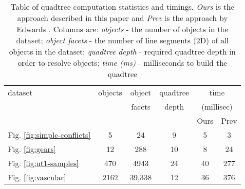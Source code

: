 \documentclass[final,3p,times,twocolumn]{elsarticle}
\begin{document}

\begin{table}
  \centering
  \footnotesize{
  \begin{tabular}{lcc|c|cc}
    \toprule
    dataset & objects & object          & quadtree
    & \multicolumn{2}{c}{time} \\
            &         & facets          & depth
    & \multicolumn{2}{c}{(millisec)} \\
           &&&
    & Ours & Prev \\
    \hline

    Fig. \ref{fig:simple-conflicts} & 5 & 24 & 9 & 5 & 3 \\

    Fig. \ref{fig:gears} & 12 & 288 & 10 & 8 & 24 \\

    Fig. \ref{fig:ut1-samples} & 470 & 4943 & 24 & 40 & 277 \\

    Fig. \ref{fig:vascular} & 2162 & 39,338 & 12 & 36 & 376 \\

    \bottomrule
  \end{tabular}}
  \caption{Table of quadtree computation statistics and timings. \emph{Ours} is the approach described in this paper and \emph{Prev} is the approach by Edwards \etal \cite{edwards2015approximating}. Columns are: \emph{objects} - the number of objects in the dataset; \emph{object facets} - the number of line segments (2D) of all objects in the dataset; \emph{quadtree depth} - required quadtree depth in order to resolve objects; \emph{time (ms)} - milliseconds to build the quadtree }
  \label{tab:timings}
\end{table}
\end{document}
